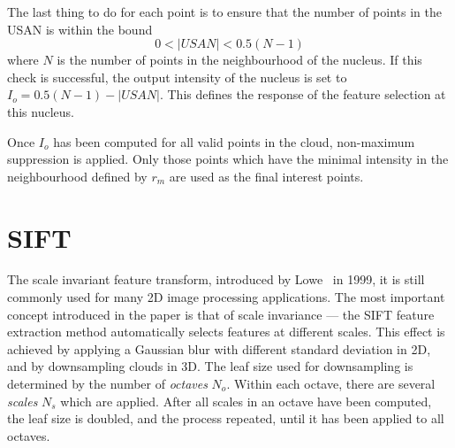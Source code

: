 \documentclass[11pt,a4paper]{kth-mag}
\begin{document}
The last thing to do for each point is to ensure that the number of points in
the USAN is within the bound
\begin{equation}
  \label{eq:13}
  0 < \left| USAN \right| < 0.5(N-1)
\end{equation}
where $N$ is the number of points in the neighbourhood of the nucleus. If this
check is successful, the output intensity of the nucleus is set to
$I_o=0.5(N-1)-\left|USAN\right|$. This defines the response of the feature
selection at this nucleus.


Once $I_o$ has been computed for all valid points in the cloud, non-maximum
suppression is applied. Only those points which have the minimal intensity in
the neighbourhood defined by $r_m$ are used as the final interest points.

\section{SIFT}
The scale invariant feature transform, introduced by
Lowe~\cite{lowe2004distinctive} in 1999, it is still commonly used for many 2D
image processing applications. The most important concept introduced in the
paper is that of scale invariance --- the SIFT feature extraction method
automatically selects features at different scales. This effect is achieved by
applying a Gaussian blur with different standard deviation in 2D, and by
downsampling clouds in 3D. The leaf size used for downsampling is determined by
the number of \emph{octaves} $N_o$. Within each octave, there are several
\emph{scales} $N_s$ which are applied. After all scales in an octave have been
computed, the leaf size is doubled, and the process repeated, until it has been
applied to all octaves.
\end{document}
